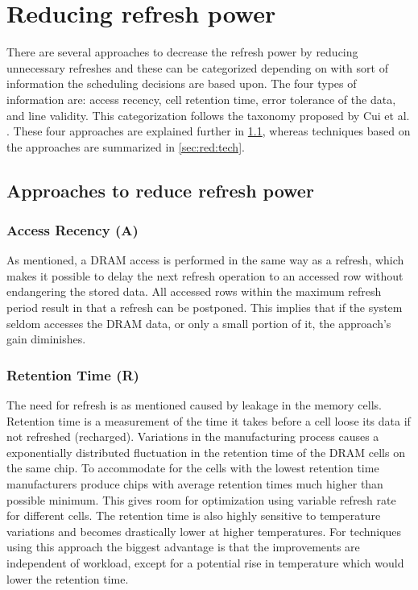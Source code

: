 \section{Reducing refresh power} 
\label{sec:red}
There are several approaches to decrease the refresh power by reducing unnecessary refreshes and these can be categorized depending on with sort of information the scheduling decisions are based upon. The four types of information are: access recency, cell retention time, error tolerance of the data, and line validity. This categorization follows the taxonomy proposed by Cui et al. \cite{dtail}. These four approaches are explained further in \ref{sec:red:app}, whereas techniques based on the approaches are summarized in \ref{sec:red:tech}. 

\subsection{Approaches to reduce refresh power}
\label{sec:red:app}

\subsubsection*{\textbf{Access Recency (A)}}
As mentioned, a DRAM access is performed in the same way as a refresh, which makes it possible to delay the next refresh operation to an accessed row without endangering the stored data. All accessed rows within the maximum refresh period result in that a refresh can be postponed. This implies that if the system seldom accesses the DRAM data, or only a small portion of it, the approach's gain diminishes.


\subsubsection*{\textbf{Retention Time (R)}}
The need for refresh is as mentioned caused by leakage in the memory cells. Retention time is a measurement of the time it takes before a cell loose its data if not refreshed (recharged). Variations in the manufacturing process causes a exponentially distributed fluctuation \cite{katayama} in the retention time of the DRAM cells on the same chip. To accommodate for the cells with the lowest retention time manufacturers produce chips with average retention times much higher than possible minimum. This gives room for optimization using variable refresh rate for different cells. The retention time is also highly sensitive to temperature variations and becomes drastically lower at higher temperatures. For techniques using this approach the biggest advantage is that the improvements are independent of workload, except for a potential rise in temperature which would lower the retention time.

